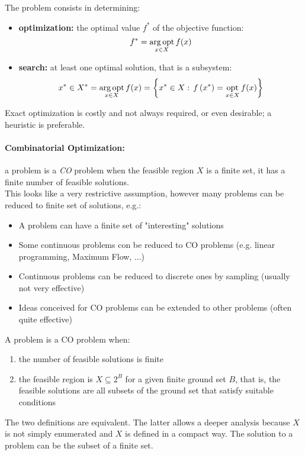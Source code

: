 \newpage

The problem consists in determining:
\begin{itemize}
	\item \textbf{optimization:} the optimal value $f^\ast$ of the objective function: 
	$$ f^\ast = \operatorname*{arg\,opt}_{x \in X} f(x) $$
	\item \textbf{search:} at least one optimal solution, that is a subsystem: 
	$$ x^\ast \in X^\ast = \operatorname*{arg\,opt}_{x \in X} f(x) = \left\{x^\ast \in X: \, f\left(x^\ast\right) = \operatorname*{opt}_{x \in X} f(x) \right\}$$
\end{itemize}
Exact optimization is costly and not always required, or even desirable; a heuristic is preferable. \\

\paragraph{Combinatorial Optimization:} a problem is a \textit{CO} problem when the feasible region $X$ is a finite set, it has a finite number of feasible solutions. \\

This looks like a very restrictive assumption, however many problems can be reduced to finite set of solutions, e.g.: 
\begin{itemize}
	\item A problem can have a finite set of "interesting" solutions
	\item Some continuous problems con be reduced to CO problems (e.g. linear programming, Maximum Flow, ...)
	\item Continuous problems can be reduced to discrete ones by sampling (usually not very effective)
	\item Ideas conceived for CO problems can be extended to other problems (often quite effective)
\end{itemize}

A problem is a CO problem when: 
\begin{enumerate}
	\item the number of feasible solutions is finite
	\item the feasible region is $X \subseteq 2^B$ for a given finite ground set $B$, that is, the feasible solutions are all subsets of the ground set that satisfy suitable conditions
\end{enumerate}
The two definitions are equivalent. The latter allows a deeper analysis because $X$ is not simply enumerated and $X$ is defined in a compact way. The solution to a problem can be the subset of a finite set. \\


